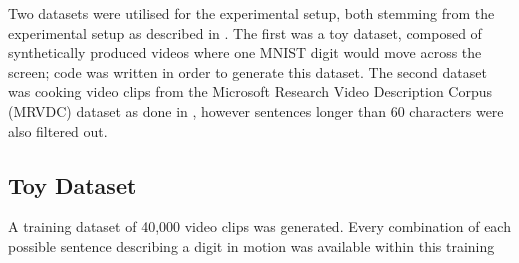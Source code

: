 \documentclass{article}
\begin{document}
Two datasets were utilised for the experimental setup, both stemming from the experimental setup as described in \cite{pan_create_2018}. The first was a toy dataset, composed of synthetically produced videos where one MNIST \cite{yann_mnist_nodate} 
digit would move across the screen; code was written in order to generate this dataset. The second dataset was cooking video clips from the
Microsoft Research Video Description Corpus (MRVDC) \cite{noauthor_microsoft_nodate} dataset 
as done in \cite{pan_create_2018}, however sentences longer than 60 characters were also filtered out.

\subsection{Toy Dataset}

A training dataset of 40,000 video clips was generated. Every combination of
each possible sentence describing a digit in motion was available within this training
\end{document}
